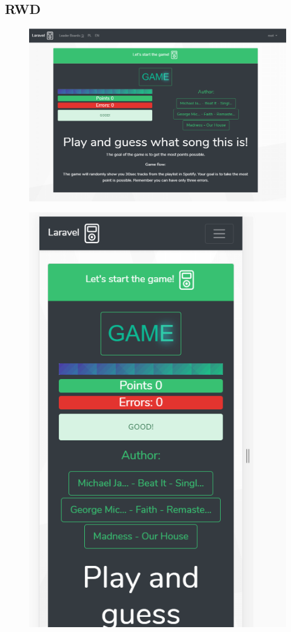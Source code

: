 \documentclass[11pt,a4paper]{article}
\begin{document}
\subsection{\textbf{RWD}}
\begin{figure} [h]
\centering
\includegraphics [keepaspectratio, scale=0.6] {1.12.png}
\end{figure}
\begin{figure} [h]
\centering
\includegraphics [keepaspectratio, scale=0.9] {1.12.1.png}
\end{figure}
\clearpage
\end{document}
